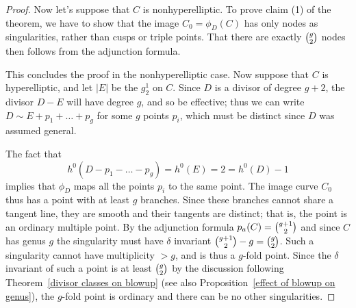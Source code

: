 \begin{proof}
\smallbreak
Now let's suppose that $C$ is nonhyperelliptic.
To prove
claim (1) of the theorem,
we
have to show
that the image $C_0 = \phi_D(C)$
has only nodes as singularities,
rather than cusps or triple points.
That there are exactly
$\tbinom{g}{2}$ nodes then follows from the
adjunction formula.
%


\noindent This concludes the proof in the nonhyperelliptic case. Now
suppose that $C$ is hyperelliptic, and let $|E|$ be the  $g^1_2$ on
$C$.
Since $D$ is a
divisor of degree $g+2$, the divisor $D - E$ will
have degree $g$, and so be effective; thus we can write
$D \sim E + p_1 + \dots + p_g$
for some
$g$ points $p_i$, which must be distinct since $D$ was assumed general.

The fact that
$$
h^0(D - p_1 - \dots - p_g) = h^0(E) = 2 = h^0(D) - 1
$$
implies that $\phi_D$ maps all the points $p_i$ to the same point. The
image curve $C_0$ thus has a point with at least $g$ branches. Since
these branches cannot share a tangent line,
they are smooth and their tangents are distinct; that is, the point is
an ordinary multiple point. By the adjunction
%
formula $p_a(C) = \tbinom{g+1}{2}$ and since $C$ has genus $g$ the
singularity must have $\delta$ invariant
$\tbinom{g+1}{2} -g = \tbinom{g}{2}$. Such a singularity cannot have
multiplicity $>g$, and is thus a $g$-fold point. Since the
%
$\delta$ invariant of such a point is at least $\tbinom{g}{2}$ by
the discussion following Theorem~\ref{divisor classes on blowup}
(see also
Proposition~\ref{effect of blowup on genus}), the $g$-fold point is ordinary and there can be no other
singularities.
\end{proof}


